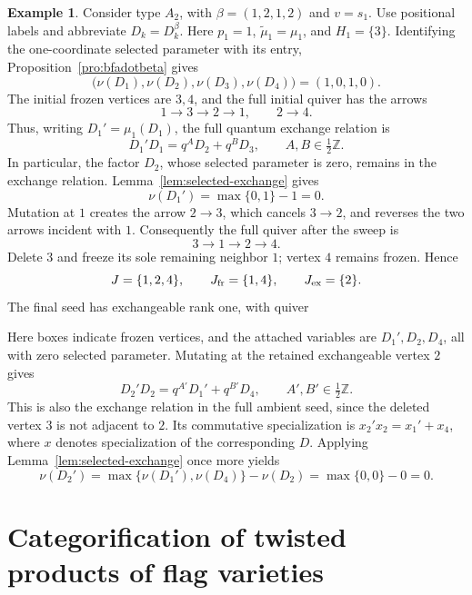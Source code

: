 \documentclass[12pt, reqno]{amsart}
\theoremstyle{plain}
\theoremstyle{definition}
\newtheorem{example}[theorem]{Example}
\numberwithin{equation}{section}
\begin{document}
\begin{example}\label{ex:positive-rank-truncated-mutation}
Consider type $A_2$, with $\beta=(1,2,1,2)$ and $v=s_1$.
Use positional labels and abbreviate $D_k=D_k^\beta$.
Here $p_1=1$, $\widetilde\mu_1=\mu_1$, and $H_1=\{3\}$.
Identifying the one-coordinate selected parameter with its entry,
Proposition~\ref{pro:bfadotbeta} gives
\[
 \bigl(\nu(D_1),\nu(D_2),\nu(D_3),\nu(D_4)\bigr)=(1,0,1,0).
\]
The initial frozen vertices are $3,4$, and the full initial quiver has
the arrows
\[
 1\longrightarrow3\longrightarrow2\longrightarrow1,
 \qquad 2\longrightarrow4.
\]
Thus, writing $D_1'=\mu_1(D_1)$, the full quantum exchange relation is
\[
 D_1'D_1=q^A D_2+q^B D_3,
 \qquad A,B\in\tfrac12\mathbb Z.
\]
In particular, the factor $D_2$, whose selected parameter is zero,
remains in the exchange relation. Lemma~\ref{lem:selected-exchange}
gives
\[
 \nu(D_1')=\max\{0,1\}-1=0.
\]
Mutation at $1$ creates the arrow $2\to3$, which cancels $3\to2$,
and reverses the two arrows incident with $1$. Consequently the full
quiver after the sweep is
\[
 3\longrightarrow1\longrightarrow2\longrightarrow4.
\]
Delete $3$ and freeze its sole remaining neighbor $1$; vertex $4$
remains frozen. Hence
\[
 J=\{1,2,4\},\qquad J_{\rm fr}=\{1,4\},\qquad J_{\rm ex}=\{2\}.
\]
The final seed has exchangeable rank one, with quiver
\begin{center}
\end{center}
Here boxes indicate frozen vertices, and the attached variables are
$D_1',D_2,D_4$, all with zero selected parameter. Mutating at the
retained exchangeable vertex $2$ gives
\[
 D_2'D_2=q^{A'}D_1'+q^{B'}D_4,
 \qquad A',B'\in\tfrac12\mathbb Z.
\]
This is also the exchange relation in the full ambient seed, since
the deleted vertex $3$ is not adjacent to $2$. Its commutative
specialization is $x_2'x_2=x_1'+x_4$, where $x$ denotes specialization
of the corresponding $D$. Applying Lemma~\ref{lem:selected-exchange}
once more yields
\[
 \nu(D_2')=\max\{\nu(D_1'),\nu(D_4)\}-\nu(D_2)
 =\max\{0,0\}-0=0.
\]
\end{example}

\section{Categorification of twisted products of flag varieties}
\label{sec:category}
\end{document}
